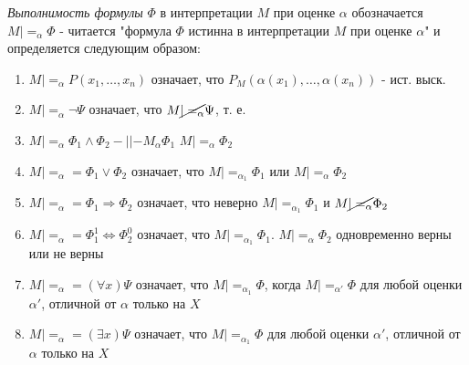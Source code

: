 \documentclass{SCWorks}
\begin{document}
\secNumbering

\tableofcontents




\newpage

\par {\it Выполнимость формулы} $\Phi$ в интерпретации $M$ при оценке $\alpha$ обозначается $M |=_\alpha \Phi$ - читается "формула $\Phi$ истинна в интерпретации $M$ при оценке $\alpha$" и определяется следующим образом:
\begin{enumerate}
    \item $M |=_\alpha P(x_1, \dots, x_n)$ означает, что $P_M(\alpha(x_1), \dots, \alpha(x_n))$ - ист. выск.
    \item $M |=_\alpha \neg \Psi$ означает, что $M \cancel{|=_\alpha} \Psi$, т. е.
    \item $M |=_\alpha \Phi_1 \land \Phi_2 -||- M_\alpha \Phi_1$ $M |=_\alpha \Phi_2$
    \item $M |=_\alpha = \Phi_1 \lor \Phi_2$ означает, что $M |=_{\alpha_1} \Phi_1$ или $M |=_\alpha \Phi_2$
    \item $M |=_\alpha = \Phi_1 \Rightarrow \Phi_2$ означает, что неверно $M |=_{\alpha_1} \Phi_1$ и $M \cancel{|=_\alpha} \Phi_2$
    \item $M |=_\alpha = \Phi_1^1 \Leftrightarrow \Phi_2^0$ означает, что $M |=_{\alpha_1} \Phi_1$. $M |=_\alpha \Phi_2$ одновременно верны или не верны
    \item $M |=_\alpha = (\forall x)\Psi$ означает, что $M |=_{\alpha_1} \Phi$, когда $M |=_{\alpha'} \Phi$ для любой оценки $\alpha'$, отличной от $\alpha$ только на $X$
    \item $M |=_\alpha = (\exists x)\Psi$ означает, что $M |=_{\alpha_1} \Phi$ для любой оценки $\alpha'$, отличной от $\alpha$ только на $X$
\end{enumerate}
\end{document}

